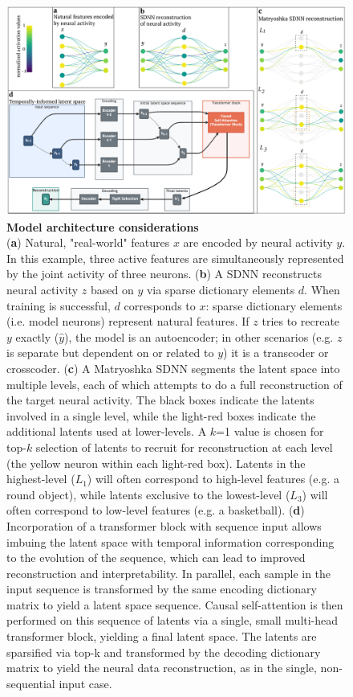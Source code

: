 \begin{figure}[tbph]
    \includegraphics[width=\linewidth]{figures/sdnn_arch.pdf}
    \caption{
        \textbf{Model architecture considerations} \\
        \small
        (\textbf{a}) Natural, "real-world" features $x$ are encoded by neural activity $y$. In this example, three active features are simultaneously represented by the joint activity of three neurons. (\textbf{b}) A SDNN reconstructs neural activity $z$ based on $y$ via sparse dictionary elements $d$. When training is successful, $d$ corresponds to $x$: sparse dictionary elements (i.e. model neurons) represent natural features. If $z$ tries to recreate $y$ exactly ($\hat{y}$), the model is an autoencoder; in other scenarios (e.g. $z$ is separate but dependent on or related to $y$) it is a transcoder or crosscoder. (\textbf{c}) A Matryoshka SDNN segments the latent space into multiple levels, each of which attempts to do a full reconstruction of the target neural activity. The black boxes indicate the latents involved in a single level, while the light-red boxes indicate the additional latents used at lower-levels. A $k$=1 value is chosen for top-$k$ selection of latents to recruit for reconstruction at each level (the yellow neuron within each light-red box). Latents in the highest-level ($L_1$) will often correspond to high-level features (e.g. a round object), while latents exclusive to the lowest-level ($L_3$) will often correspond to low-level features (e.g. a basketball). (\textbf{d}) Incorporation of a transformer block with sequence input allows imbuing the latent space with temporal information corresponding to the evolution of the sequence, which can lead to improved reconstruction and interpretability. In parallel, each sample in the input sequence is transformed by the same encoding dictionary matrix to yield a latent space sequence. Causal self-attention is then performed on this sequence of latents via a single, small multi-head transformer block, yielding a final latent space. The latents are sparsified via top-k and transformed by the decoding dictionary matrix to yield the neural data reconstruction, as in the single, non-sequential input case. 
    }
    \label{figure:sdnn_arch}
\end{figure}

